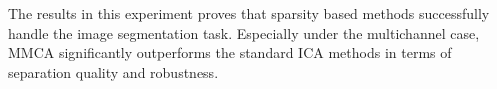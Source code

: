The results in this experiment proves that sparsity based methods successfully handle the image segmentation task. Especially under the multichannel case, MMCA significantly outperforms the standard ICA methods in terms of separation quality and robustness.\\

\begin{figure}[h]
\centering
{}
\end{figure}
